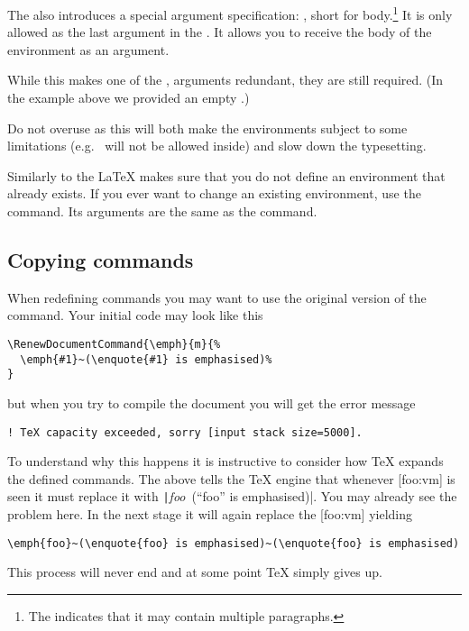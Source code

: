 The  also introduces a special argument
specification: , short for body.\footnote{The \cargv{+} indicates
  that it may contain multiple paragraphs.} It is only allowed as the last
argument in the . It allows you to receive the body of the
environment as an argument.
While this makes one of the ,  arguments redundant,
they are still required. (In the example above we provided an empty .)

Do not overuse  as this will both make the environments subject to
some limitations (e.g.\  will not be allowed inside) and slow down the
typesetting.

Similarly to the  \LaTeX{} makes sure that you do not
define an environment that already exists. If you ever want to change an
existing environment, use the  command. Its
arguments are the same as the  command.

\subsection{Copying commands}\label{sec:copyingcommands}

When redefining commands you may want to use the original version of the
command. Your initial code may look like this
\begin{verbatim}
\RenewDocumentCommand{\emph}{m}{%
  \emph{#1}~(\enquote{#1} is emphasised)%
}
\end{verbatim}
but when you try to compile the document you will get the error message
\begin{verbatim}
! TeX capacity exceeded, sorry [input stack size=5000].
\end{verbatim}

To understand why this happens it is instructive to consider how \TeX{} expands
the defined commands. The above  tells the \TeX{}
engine that whenever [foo:vm] is seen it must replace it with
\texttt|\emph{foo}~(\enquote{foo} is emphasised)|. You may already see the
problem here. In the next stage it will again replace the [foo:vm]
yielding
\begin{verbatim}
\emph{foo}~(\enquote{foo} is emphasised)~(\enquote{foo} is emphasised)
\end{verbatim}
This process will never end and at some point \TeX{}
simply gives up.

